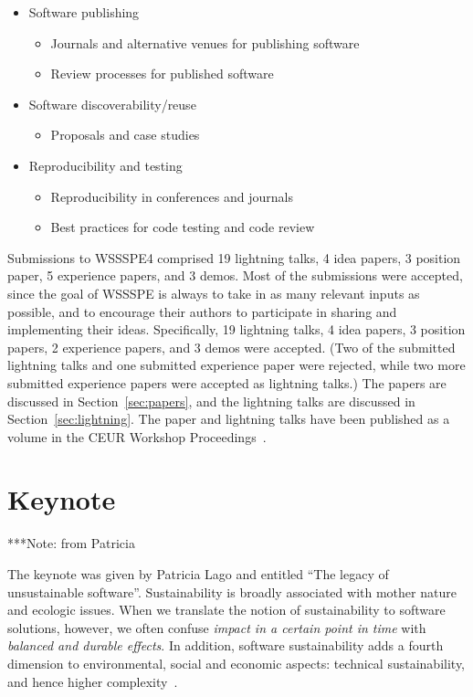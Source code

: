 \documentclass[11pt, oneside]{amsart}
\newcommand{\note}[1]{ {\textcolor{blueish}    { ***Note:      #1 }}}
\begin{document}
\begin{itemize}
\item Software publishing
\begin{itemize}
    \item Journals and alternative venues for publishing software
    \item Review processes for published software
\end{itemize}

\item Software discoverability/reuse
\begin{itemize}
    \item Proposals and case studies
\end{itemize}

\item Reproducibility and testing
\begin{itemize}
    \item Reproducibility in conferences and journals
    \item Best practices for code testing and code review
\end{itemize}

\end{itemize}

Submissions to WSSSPE4 comprised
19 lightning talks,
4 idea papers,
3 position paper,
5 experience papers,
and
3 demos.
Most of the submissions were accepted, since the goal of WSSSPE is always to
take in as many relevant inputs as possible, and to encourage their authors to
participate in sharing and implementing their ideas.
Specifically,
19 lightning talks,
4 idea papers,
3 position papers,
2 experience papers,
and
3 demos
were accepted. (Two of the submitted lightning talks and one submitted experience paper were rejected, while two more submitted experience papers
were accepted as lightning talks.)
The papers are discussed in Section~\ref{sec:papers},
and the lightning talks are discussed in Section~\ref{sec:lightning}.
The paper and lightning talks have been published as a volume in the CEUR Workshop Proceedings~\cite{WSSSPE4-proceedings}.

\section{Keynote}\label{sec:keynote}

\note{from Patricia}

The keynote was given by Patricia Lago and entitled ``The legacy of unsustainable software''.
%
Sustainability is broadly associated with mother nature and ecologic issues. When we translate the notion of sustainability to software solutions, however, we often confuse {\em impact in a certain point in time} with {\em balanced and durable effects}. In addition, software sustainability adds a fourth dimension to environmental, social and economic aspects: technical sustainability, and hence higher complexity~\cite{Lago2015}.
\end{document}
